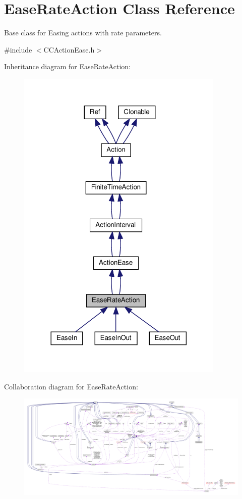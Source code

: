 \hypertarget{classEaseRateAction}{}\section{Ease\+Rate\+Action Class Reference}
\label{classEaseRateAction}


Base class for Easing actions with rate parameters.  




{\ttfamily \#include $<$C\+C\+Action\+Ease.\+h$>$}



Inheritance diagram for Ease\+Rate\+Action\+:
\nopagebreak
\begin{figure}[H]
\begin{center}
\leavevmode
\includegraphics[width=281pt]{classEaseRateAction__inherit__graph}
\end{center}
\end{figure}


Collaboration diagram for Ease\+Rate\+Action\+:
\nopagebreak
\begin{figure}[H]
\begin{center}
\leavevmode
\includegraphics[width=350pt]{classEaseRateAction__coll__graph}
\end{center}
\end{figure}
